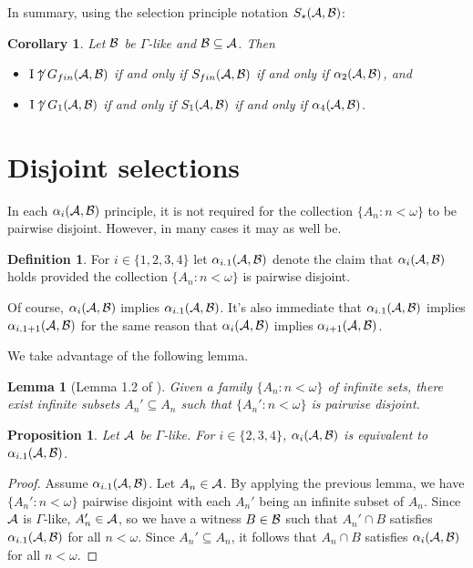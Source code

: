 \documentclass{amsart}
\theoremstyle{plain}
\newtheorem{lemma}[theorem]{Lemma}
\newtheorem{corollary}[theorem]{Corollary}
\newtheorem{proposition}[theorem]{Proposition}
\theoremstyle{definition}
\newtheorem{definition}[theorem]{Definition}
\theoremstyle{remark}
\theoremstyle{plain}
\theoremstyle{definition}
\theoremstyle{remark}
\begin{document}
In summary, using the selection principle notation \(S_\star(\mathcal{A},\mathcal{B})\):

\begin{corollary}
Let \(\mathcal{B}\) be \(\Gamma\)-like and \(\mathcal{B}\subseteq\mathcal{A}\).
Then 
\begin{itemize}
\item \(\mathrm{I}\not\uparrow G_{fin}(\mathcal{A},\mathcal{B})\) if and only if
\(S_{fin}(\mathcal{A},\mathcal{B})\) if and only if
\(\alpha_2(\mathcal{A},\mathcal{B})\), and
\item \(\mathrm{I}\not\uparrow G_{1}(\mathcal{A},\mathcal{B})\) if and only if
\(S_{1}(\mathcal{A},\mathcal{B})\) if and only if
\(\alpha_4(\mathcal{A},\mathcal{B})\).
\end{itemize}
\end{corollary}

\section{Disjoint selections}

In each \(\alpha_i(\mathcal{A},\mathcal{B})\) principle, it is not required for the collection
\(\{A_n:n<\omega\}\) to be pairwise disjoint. However, in many cases it may as
well be.

\begin{definition}
For \(i\in\{1,2,3,4\}\) let \(\alpha_{i.1}(\mathcal{A},\mathcal{B})\) denote the claim that
\(\alpha_i(\mathcal{A},\mathcal{B})\) holds provided the collection \(\{A_n:n<\omega\}\)
is pairwise disjoint.
\end{definition}

Of course, \(\alpha_i(\mathcal{A},\mathcal{B})\) implies \(\alpha_{i.1}(\mathcal{A},\mathcal{B})\).
It's also immediate that \(\alpha_{i.1}(\mathcal{A},\mathcal{B})\) implies
\(\alpha_{i.1+1}(\mathcal{A},\mathcal{B})\) for the same reason that \(\alpha_i(\mathcal{A},\mathcal{B})\)
implies \(\alpha_{i+1}(\mathcal{A},\mathcal{B})\). 

We take advantage of the following lemma.

\begin{lemma}[Lemma 1.2 of \cite{MR1195504}]
Given a family \(\{A_n:n<\omega\}\) of infinite sets, there exist infinite subsets
\(A_n'\subseteq A_n\) such that \(\{A_n':n<\omega\}\) is pairwise disjoint.
\end{lemma}

\begin{proposition}\label{pointOne}
Let \(\mathcal{A}\) be \(\Gamma\)-like.
For \(i\in\{2,3,4\}\), \(\alpha_i(\mathcal{A},\mathcal{B})\) is equivalent to
\(\alpha_{i.1}(\mathcal{A},\mathcal{B})\).
\end{proposition}

\begin{proof}
Assume \(\alpha_{i.1}(\mathcal{A},\mathcal{B})\).
Let \(A_n\in\mathcal{A}\). By applying the previous lemma, we have
\(\{A_n':n<\omega\}\) pairwise disjoint with each \(A_n'\) being
an infinite subset of \(A_n\). Since \(\mathcal{A}\) is \(\Gamma\)-like,
\(A_n'\in\mathcal{A}\), so we have a witness \(B\in\mathcal{B}\) such that
\(A_n'\cap B\) satisfies \(\alpha_{i.1}(\mathcal{A},\mathcal{B})\) for all \(n<\omega\).
Since \(A_n'\subseteq A_n\), it follows that \(A_n\cap B\) satisfies
\(\alpha_{i}(\mathcal{A},\mathcal{B})\) for all \(n<\omega\).
\end{proof}
\end{document}

